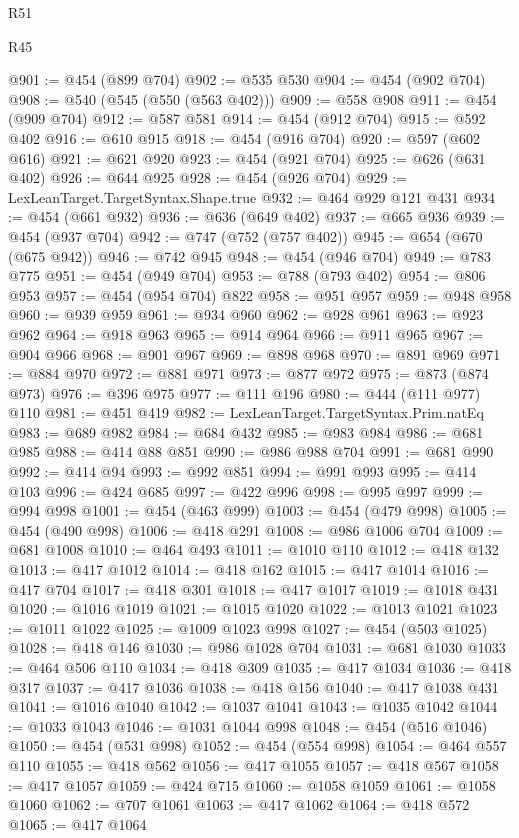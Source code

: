 \begin{lexlean}{R51}
\begin{lexlean}{R45}
\begin{coremodule}
{{{{{{{{{{{{{{{{{{{{{{{{{{{{{{{{{{{{{{{{{{{{{{{{{{{{{{{{{{{{{{{{{{{{{{{{{{{{{{{{{{{{{{{{{{{@901 := @454 (@899 @704)
@902 := @535 @530
@904 := @454 (@902 @704)
@908 := @540 (@545 (@550 (@563 @402)))
@909 := @558 @908
@911 := @454 (@909 @704)
@912 := @587 @581
@914 := @454 (@912 @704)
@915 := @592 @402
@916 := @610 @915
@918 := @454 (@916 @704)
@920 := @597 (@602 @616)
@921 := @621 @920
@923 := @454 (@921 @704)
@925 := @626 (@631 @402)
@926 := @644 @925
@928 := @454 (@926 @704)
@929 := LexLeanTarget.TargetSyntax.Shape.true
@932 := @464 @929 @121 @431
@934 := @454 (@661 @932)
@936 := @636 (@649 @402)
@937 := @665 @936
@939 := @454 (@937 @704)
@942 := @747 (@752 (@757 @402))
@945 := @654 (@670 (@675 @942))
@946 := @742 @945
@948 := @454 (@946 @704)
@949 := @783 @775
@951 := @454 (@949 @704)
@953 := @788 (@793 @402)
@954 := @806 @953
@957 := @454 (@954 @704) @822
@958 := @951 @957
@959 := @948 @958
@960 := @939 @959
@961 := @934 @960
@962 := @928 @961
@963 := @923 @962
@964 := @918 @963
@965 := @914 @964
@966 := @911 @965
@967 := @904 @966
@968 := @901 @967
@969 := @898 @968
@970 := @891 @969
@971 := @884 @970
@972 := @881 @971
@973 := @877 @972
@975 := @873 (@874 @973)
@976 := @396 @975
@977 := @111 @196
@980 := @444 (@111 @977) @110
@981 := @451 @419
@982 := LexLeanTarget.TargetSyntax.Prim.natEq
@983 := @689 @982
@984 := @684 @432
@985 := @983 @984
@986 := @681 @985
@988 := @414 @88 @851
@990 := @986 @988 @704
@991 := @681 @990
@992 := @414 @94
@993 := @992 @851
@994 := @991 @993
@995 := @414 @103
@996 := @424 @685
@997 := @422 @996
@998 := @995 @997
@999 := @994 @998
@1001 := @454 (@463 @999)
@1003 := @454 (@479 @998)
@1005 := @454 (@490 @998)
@1006 := @418 @291
@1008 := @986 @1006 @704
@1009 := @681 @1008
@1010 := @464 @493
@1011 := @1010 @110
@1012 := @418 @132
@1013 := @417 @1012
@1014 := @418 @162
@1015 := @417 @1014
@1016 := @417 @704
@1017 := @418 @301
@1018 := @417 @1017
@1019 := @1018 @431
@1020 := @1016 @1019
@1021 := @1015 @1020
@1022 := @1013 @1021
@1023 := @1011 @1022
@1025 := @1009 @1023 @998
@1027 := @454 (@503 @1025)
@1028 := @418 @146
@1030 := @986 @1028 @704
@1031 := @681 @1030
@1033 := @464 @506 @110
@1034 := @418 @309
@1035 := @417 @1034
@1036 := @418 @317
@1037 := @417 @1036
@1038 := @418 @156
@1040 := @417 @1038 @431
@1041 := @1016 @1040
@1042 := @1037 @1041
@1043 := @1035 @1042
@1044 := @1033 @1043
@1046 := @1031 @1044 @998
@1048 := @454 (@516 @1046)
@1050 := @454 (@531 @998)
@1052 := @454 (@554 @998)
@1054 := @464 @557 @110
@1055 := @418 @562
@1056 := @417 @1055
@1057 := @418 @567
@1058 := @417 @1057
@1059 := @424 @715
@1060 := @1058 @1059
@1061 := @1058 @1060
@1062 := @707 @1061
@1063 := @417 @1062
@1064 := @418 @572
@1065 := @417 @1064
}}}}}}}}}}}}}}}}}}}}}}}}}}}}}}}}}}}}}}}}}}}}}}}}}}}}}}}}}}}}}}}}}}}}}}}}}}}}}}}}}}}}}}}}}}}
\end{coremodule}
\end{lexlean}
\end{lexlean}
